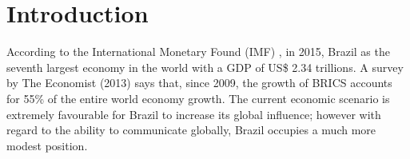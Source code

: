 \documentclass[twocolumn]{bmcart}%
\begin{document}
\begin{frontmatter}
\begin{abstractbox}
\begin{keyword}
\end{keyword}


\end{abstractbox}
%

\end{frontmatter}




\pagestyle{plain}
\section*{Introduction}
According to the International Monetary Found (IMF) \cite{IMF2015}, in 2015, Brazil as the seventh largest economy in the world with a GDP of US\$ 2.34 trillions. A survey by The Economist (2013) says that, since 2009, the growth of BRICS accounts for 55\% of the entire world economy growth. The current economic scenario is extremely favourable for Brazil to increase its global influence; however with regard to the ability to communicate globally, Brazil occupies a much more modest position. 
\end{document}
